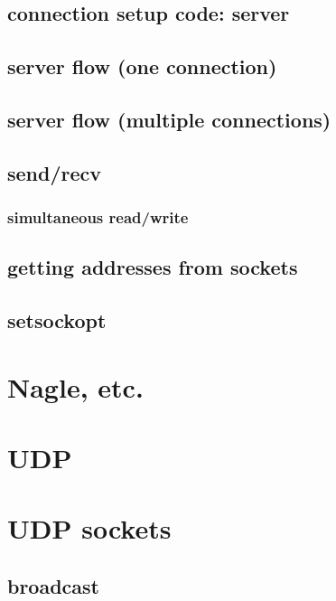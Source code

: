 \subsection{connection setup code: server}
 

\subsection{server flow (one connection)}


\subsection{server flow (multiple connections)}


\subsection{send/recv}


\subsubsection{simultaneous read/write}


\subsection{getting addresses from sockets}


\subsection{setsockopt}


\section{Nagle, etc.}


\section{UDP}

\section{UDP sockets}


\subsection{broadcast}


